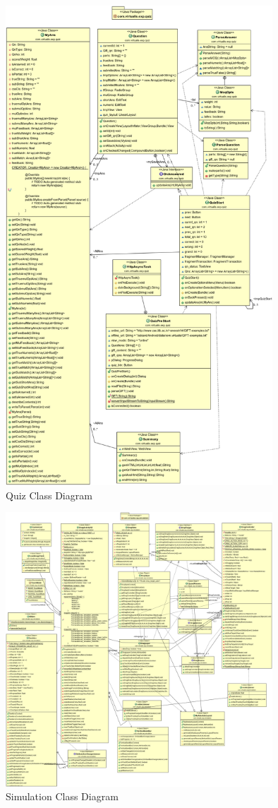 \documentclass[12pt]{report}
\begin{document}
\begin{figure}[H]
 \centering
 \includegraphics[width=10cm]{./class_quiz.png}
 \caption{Quiz Class Diagram\label{fig:class_quiz}}
\end{figure}

\begin{figure}[H]
 \centering
 \includegraphics[width=10cm]{./class_simulation.png}
 \caption{Simulation Class Diagram\label{fig:class_simulation}}
\end{figure}
\end{document}
